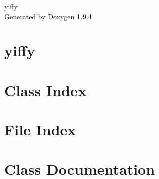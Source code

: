 \documentclass[twoside]{book}
\newcommand{\+}{\discretionary{\mbox{\scriptsize$\hookleftarrow$}}{}{}}
\newcommand{\clearemptydoublepage}{%
    \newpage{\pagestyle{empty}\cleardoublepage}%
  }
\begin{document}
  \raggedbottom
    \hypersetup{pageanchor=false,
                bookmarksnumbered=true,
                pdfencoding=unicode
               }
  \begin{titlepage}
  \vspace*{7cm}
  \begin{center}%
  {\Large yiffy}\\
  \vspace*{1cm}
  {\large Generated by Doxygen 1.9.4}\\
  \end{center}
  \end{titlepage}
  \clearemptydoublepage
  \tableofcontents
  \clearemptydoublepage
  \hypersetup{pageanchor=true}
\chapter{yiffy}
\label{index}\hypertarget{index}{}
\chapter{Class Index}

\chapter{File Index}

\chapter{Class Documentation}









\end{document}
